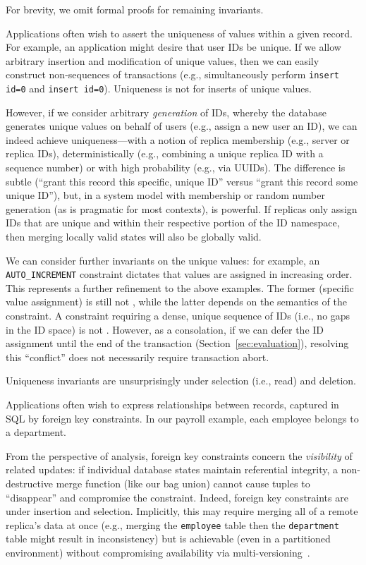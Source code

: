 For brevity, we omit formal proofs for remaining invariants.

 Applications often wish to assert the uniqueness
of values within a given record. For example, an application might
desire that user IDs be unique. If we allow arbitrary insertion and
modification of unique values, then we can easily construct
non-\iconfluent sequences of transactions (e.g., simultaneously
perform \texttt{insert id=0} and \texttt{insert id=0}). Uniqueness is
not \iconfluent for inserts of unique values.

However, if we consider arbitrary \textit{generation} of IDs, whereby
the database generates unique values on behalf of users (e.g., assign
a new user an ID), we can indeed achieve uniqueness---with a notion of
replica membership (e.g., server or replica IDs), deterministically
(e.g., combining a unique replica ID with a sequence number) or with
high probability (e.g., via UUIDs). The difference is subtle (``grant
this record this specific, unique ID'' versus ``grant this record some
unique ID''), but, in a system model with membership or random number
generation (as is pragmatic for most contexts), is powerful. If
replicas only assign IDs that are unique and within their respective
portion of the ID namespace, then merging locally valid states will
also be globally valid.

We can consider further invariants on the unique values: for example,
an \texttt{AUTO\_INCREMENT} constraint dictates that values are
assigned in increasing order. This represents a further refinement to
the above examples. The former (specific value assignment) is still
not \iconfluent, while the latter depends on the semantics of the
constraint. A constraint requiring a dense, unique sequence of IDs
(i.e., no gaps in the ID space) is not \iconfluent. However, as a
consolation, if we can defer the ID assignment until the end of the
transaction (Section~\ref{sec:evaluation}), resolving this
``conflict'' does not necessarily require transaction abort. 

Uniqueness invariants are unsurprisingly \iconfluent under selection
(i.e., read) and deletion.

 Applications often wish to express
relationships between records, captured in SQL by foreign key
constraints. In our payroll example, each employee belongs to a
department.

From the perspective of \iconfluence analysis, foreign key constraints
concern the \textit{visibility} of related updates: if individual
database states maintain referential integrity, a non-destructive
merge function (like our bag union) cannot cause tuples to
``disappear'' and compromise the constraint. Indeed, foreign key
constraints are \iconfluent under insertion and selection. Implicitly,
this may require merging all of a remote replica's data at once (e.g.,
merging the \texttt{employee} table then the \texttt{department} table
might result in inconsistency) but is achievable (even in a
partitioned environment) without compromising availability via
multi-versioning~\cite{ramp-txns,hat-vldb}.

